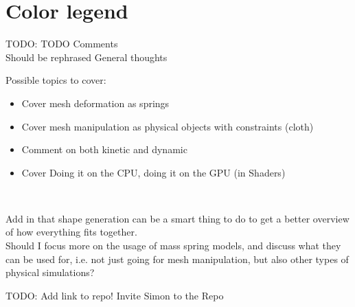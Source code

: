 \documentclass[MACS,english]{ntnuthesis/ntnuthesis}
\newcommand{\todo}[1]{{\color{blue}TODO: #1\\}}
\newcommand{\rephrase}[1]{{\color{Aquamarine} #1}}
\newcommand{\think}[1]{{\color{Orchid} #1\\}}
\begin{document}
\makefrontpages %


\tableofcontents

\hypersetup{pageanchor=true}


\section{Color legend}
\todo{TODO Comments}
\rephrase{Should be rephrased}
\think{General thoughts}

\think
{
    Possible topics to cover:
    \begin{itemize}
        \item Cover mesh deformation as springs
        \item Cover mesh manipulation as physical objects with constraints (cloth)
        \item Comment on both kinetic and dynamic
        \item Cover Doing it on the CPU, doing it on the GPU (in Shaders)
    \end{itemize}
}

\think{ Add in that shape generation can be a smart thing to do to get a better overview of how everything fits together.}
\think{Should I focus more on the usage of mass spring models, and discuss what they can be used for, i.e. not just going for mesh manipulation, but also other types of physical simulations?}

\todo{Add link to repo! Invite Simon to the Repo}


%
%
%




\appendix

%
\end{document}

